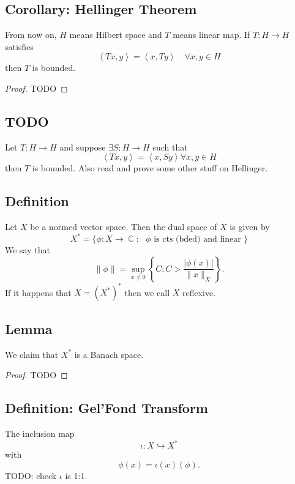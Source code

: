 \documentclass{article}
\DeclareMathOperator\C{\mathbb{C}}
\DeclareMathOperator\la{\langle}
\DeclareMathOperator\ra{\rangle}
\begin{document}
\subsection*{Corollary: Hellinger Theorem}
From now on, $H$ means Hilbert space and $T$ means linear map. If $T:H \to H$ satisfies $$
\la Tx,y \ra = \la x, Ty \ra \quad \forall x,y \in H
$$
then $T$ is bounded.
\begin{proof}
TODO
\end{proof}
\subsection*{TODO}
Let $T: H \to H$ and suppose $\exists S: H \to H$ such that $$
\la Tx,y \ra = \la x, Sy \ra \forall x,y \in H
$$
then $T$ is bounded. Also read and prove some other stuff on Hellinger.
\subsection*{Definition}
Let $X$ be a normed vector space.
Then the dual space of $X$ is given by
$$
X^* = \{ \phi: X \to \C: \text{ $\phi$ is cts (bded) and linear }\}
$$
We say that $$
\|\phi \| = \sup_{x \not =0} \left \{ C:C > \frac{| \phi(x)|}{\|x\|_X} \right \}.
$$
If it happens that $X = (X^*)^*$ then we call $X$ reflexive.
\subsection*{Lemma}
We claim that $X^*$ is a Banach space.
\begin{proof}
TODO
\end{proof}
\subsection*{Definition: Gel'Fond Transform}
The inclusion map $$
\iota: X \hookrightarrow X^*
$$
with $$
\phi(x) = \iota(x)(\phi).
$$
TODO: check $\iota$ is 1:1.
\end{document}
